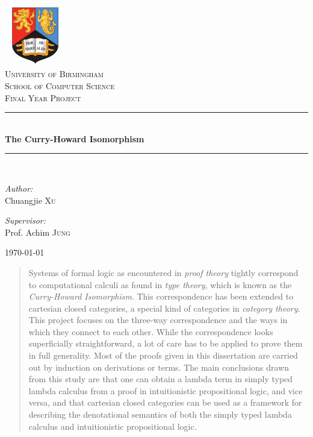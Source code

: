 \documentclass[12pt,a4paper,fleqn]{article}
\theoremstyle{definition}
\theoremstyle{plain}
\theoremstyle{plain}
\theoremstyle{definition}
\begin{document}
\begin{titlepage}
\begin{center}
\includegraphics[width=0.2\textwidth]{./images/bham_logo}\\[1cm]
\textsc{\LARGE University of Birmingham}\\[0.5cm]
\textsc{\Large School of Computer Science}\\[1.5cm]
\textsc{\large Final Year Project}\\[0.3cm]
\rule{\linewidth}{0.5mm} \\[0.6cm]
{ \huge \bfseries The Curry-Howard Isomorphism}\\[0.1cm]
\rule{\linewidth}{0.5mm} \\[1.5cm]
\begin{minipage}{0.4\textwidth}
\begin{flushleft} \large
\emph{Author:}\\
Chuangjie \textsc{Xu}
\end{flushleft}
\end{minipage}
\begin{minipage}{0.4\textwidth}
\begin{flushright} \large
\emph{Supervisor:} \\
Prof. Achim \textsc{Jung}
\end{flushright}
\end{minipage}
\vfill
{\large \today}
\end{center}
\end{titlepage}

\begin{abstract}
Systems of formal logic as encountered in \emph{proof theory} tightly correspond to computational calculi as found in \emph{type theory}, which is known as the \emph{Curry-Howard Isomorphism}. This correspondence has been extended to cartesian closed categories, a special kind of categories in \emph{category theory}. This project focuses on the three-way correspondence and the ways in which they connect to each other. While the correspondence looks superficially straightforward, a lot of care has to be applied to prove them in full generality. Most of the proofs given in this dissertation are carried out by induction on derivations or terms. The main conclusions drawn from this study are that one can obtain a lambda term in simply typed lambda calculus from a proof in intuitionistic propositional logic, and vice versa, and that cartesian closed categories can be used as a framework for describing the denotational semantics of both the simply typed lambda calculus and intuitionistic propositional logic.\\[50pt]
\end{abstract}
\end{document}
